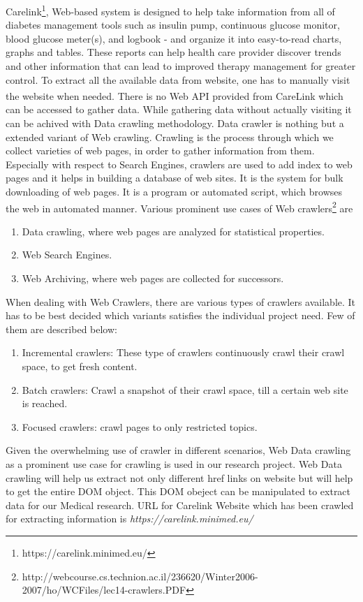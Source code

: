 \documentclass[article,type=msc,colorback,accentcolor=tud9c,twoside,11pt]{tudthesis}
\begin{document}
Carelink\footnote{https://carelink.minimed.eu/}, Web-based system is designed to help take information from all of diabetes management tools such as insulin pump, continuous glucose monitor, blood glucose meter(s), and logbook - and organize it into easy-to-read charts, graphs and tables. These reports can help health care provider discover trends and other information that can lead to improved therapy management for greater control. To extract all the available data from website, one has to manually visit the website when needed. There is no Web API provided from CareLink\textsuperscript{\textregistered} which can be accessed to gather data. While gathering data without actually visiting it can be achived with Data crawling methodology. Data crawler is nothing but a extended variant of Web crawling. Crawling is the process through which we collect varieties of web pages, in order to gather information from them. Especially with respect to Search Engines, crawlers are used to add index to web pages and it helps in building a database of web sites. It is the system for bulk downloading of web pages. It is a program or automated script, which browses the web in automated manner. Various prominent use cases of Web crawlers\footnote{http://webcourse.cs.technion.ac.il/236620/Winter2006-2007/ho/WCFiles/lec14-crawlers.PDF} are
\begin{enumerate}
\item	Data crawling, where web pages are analyzed for statistical properties.
\item	Web Search Engines.
\item	Web Archiving, where web pages are collected for successors.
\end{enumerate}
When dealing with Web Crawlers, there are various types of crawlers available. It has to be best decided which variants satisfies the individual project need. Few of them are described below:
\begin{enumerate}
\item	Incremental crawlers: These type of crawlers continuously crawl their crawl space, to get fresh content.
\item	Batch crawlers: Crawl a snapshot of their crawl space, till a certain web site is reached.
\item	Focused crawlers: crawl pages to only restricted topics.
\end{enumerate}
Given the overwhelming use of crawler in different scenarios, Web Data crawling as a prominent use case for crawling is used in our research project. Web Data crawling will help us extract not only different href links on website but will help to get the entire DOM object. This DOM obeject can be manipulated to extract data for our Medical research. URL for Carelink Website which has been crawled for extracting information is \textit{https://carelink.minimed.eu/}
\end{document}
